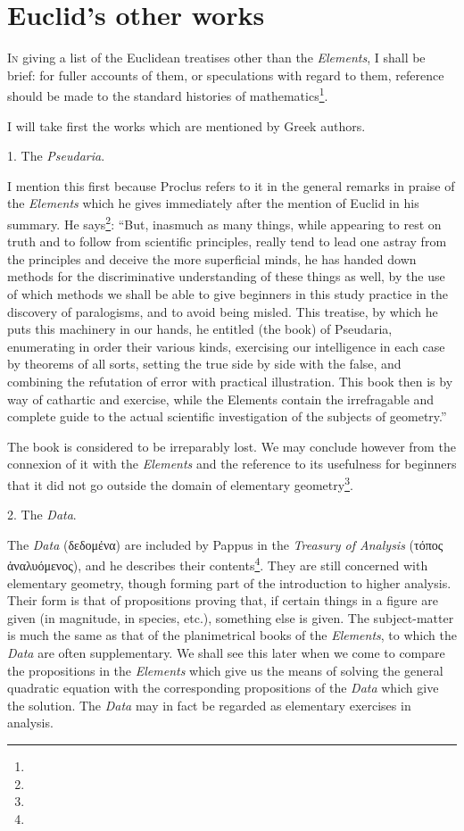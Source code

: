 \chapter{Euclid's other works}

\textsc{In} giving a list of the Euclidean treatises other than the \emph{Elements}, I shall be brief: for fuller accounts of them, or speculations with regard to them, reference should be made to the standard histories of mathematics\footnote{}.

I will take first the works which are mentioned by Greek authors.

1. The \emph{Pseudaria}.

I mention this first because Proclus refers to it in the general remarks in praise of the \emph{Elements} which he gives immediately after the mention of Euclid in his summary. He says\footnote{}: ``But, inasmuch as many things, while appearing to rest on truth and to follow from scientific principles, really tend to lead one astray from the principles and deceive the more superficial minds, he has handed down methods for the discriminative understanding of these things as well, by the use of which methods we shall be able to give beginners in this study practice in the discovery of paralogisms, and to avoid being misled. This treatise, by which he puts this machinery in our hands, he entitled (the book) of Pseudaria, enumerating in order their various kinds, exercising our intelligence in each case by theorems of all sorts, setting the true side by side with the false, and combining the refutation of error with practical illustration. This book then is by way of cathartic and exercise, while the Elements contain the irrefragable and complete guide to the actual scientific investigation of the subjects of geometry.''

The book is considered to be irreparably lost. We may conclude however from the connexion of it with the \emph{Elements} and the reference to its usefulness for beginners that it did not go outside the domain of elementary geometry\footnote{}.

2. The \emph{Data}.

The \emph{Data} (δεδομένα) are included by Pappus in the \emph{Treasury of Analysis} (τόπος ἀναλυόμενος), and he describes their contents\footnote{}. They are still concerned with elementary geometry, though forming part of the introduction to higher analysis. Their form is that of propositions proving that, if certain things in a figure are given (in magnitude, in species, etc.), something else is given. The subject-matter is much the same as that of the planimetrical books of the \emph{Elements}, to which the \emph{Data} are often supplementary. We shall see this later when we come to compare the propositions in the \emph{Elements} which give us the means of solving the general quadratic equation with the corresponding propositions of the \emph{Data} which give the solution. The \emph{Data} may in fact be regarded as elementary exercises in analysis.

